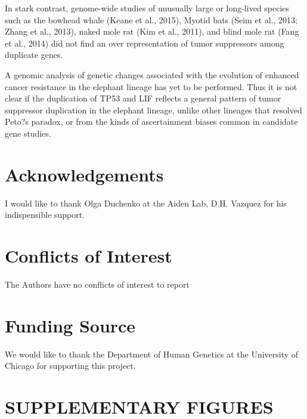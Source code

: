 \documentclass[10pt,letterpaper]{article}
\begin{document}
In stark contrast, genome-wide studies of unusually large or long-lived
species such as the bowhead whale (Keane et al., 2015), Myotid bats
(Seim et al., 2013; Zhang et al., 2013), naked mole rat (Kim et al.,
2011), and blind mole rat (Fang et al., 2014) did not find an over
representation of tumor suppressors among duplicate genes.

A genomic analysis of genetic changes associated with the evolution of
enhanced cancer resistance in the elephant lineage has yet to be
performed. Thus it is not clear if the duplication of TP53 and LIF
reflects a general pattern of tumor suppressor duplication in the
elephant lineage, unlike other lineages that resolved Peto?s paradox, or
from the kinds of ascertainment biases common in candidate gene studies.

\hypertarget{acknowledgements}{%
\section{Acknowledgements}\label{acknowledgements}}

I would like to thank Olga Duchenko at the Aiden Lab, D.H. Vazquez for
his indispensible support.

\hypertarget{conflicts-of-interest}{%
\section{Conflicts of Interest}\label{conflicts-of-interest}}

The Authors have no conflicts of interest to report

\hypertarget{funding-source}{%
\section{Funding Source}\label{funding-source}}

We would like to thank the Department of Human Genetics at the
University of Chicago for supporting this project.

\hypertarget{supplementary-figures}{%
\section{SUPPLEMENTARY FIGURES}\label{supplementary-figures}}
\end{document}
